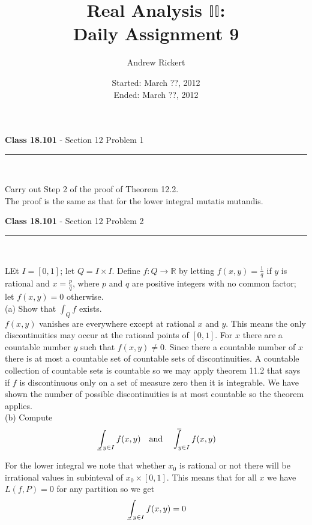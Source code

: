 \documentclass[11pt,reqno]{article}
\title{Real Analysis $\mathbb{II}$: \\ Daily Assignment 9}
\author{Andrew Rickert}
\date{Started: March ??, 2012 \\ \hspace{1pt} Ended: March ??,  2012}                                           %
\def\uint{\mathchoice%
    {\mkern13mu\overline{\vphantom{\intop}\mkern9mu}\mkern-20mu}%
    {\mkern9mu\overline{\vphantom{\intop}\mkern9mu}\mkern-14mu}%
    {\mkern9mu\overline{\vphantom{\intop}\mkern9mu}\mkern-14mu}%
    {\mkern9mu\overline{\vphantom{\intop}\mkern9mu}\mkern-14mu}%
  \int}
\def\lint{\mkern3mu\underline{\vphantom{\intop}\mkern9mu}\mkern-10mu\int}
\begin{document}
\maketitle


\begin{flushleft} 
\textbf{Class 18.101} - Section 12 Problem 1\\
\rule{500pt}{1pt}\\
\end{flushleft} 

\noindent Carry out Step 2 of the proof of Theorem 12.2.\\

The proof is the same as that for the lower integral mutatis mutandis.

\begin{flushleft} 
\textbf{Class 18.101} - Section 12 Problem 2\\
\rule{500pt}{1pt}\\
\end{flushleft} 

LEt $I = [0,1]$; let $Q = I \times I$. Define $f : Q \to \mathbb{R}$ by letting $f(x,y) = \frac{1}{q}$ if $y$ is rational and $x = \frac{p}{q}$, where $p$ and $q$ are positive integers with no common factor; let $f(x,y) = 0$ otherwise.\\

\noindent (a) Show that $\int_Q f$ exists.\\

$f(x,y)$ vanishes are everywhere except at rational $x$ and $y$. This means the only discontinuities may occur at the rational points of $[0,1]$. For $x$ there are a countable number $y$ such that $f(x,y) \neq 0$. Since there a countable number of $x$ there is at most a countable set of countable sets of discontinuities. A countable collection of countable sets is countable so we may apply theorem 11.2 that says if $f$ is discontinuous only on a set of measure zero then it is integrable. We have shown the number of possible discontinuities is at most countable so the theorem applies.\\

\noindent (b) Compute
\[ \lint_{y \in I} f(x,y) \quad \text{and} \quad \uint_{y \in I} f(x,y)\]

For the lower integral we note that whether $x_0$ is rational or not there will be irrational values in subinteval of $x_0 \times [0,1]$. This means that for all $x$ we have $L(f,P) = 0$ for any partition so we get 
\[ \lint_{y \in I} f(x,y)  = 0 \]
\end{document}

